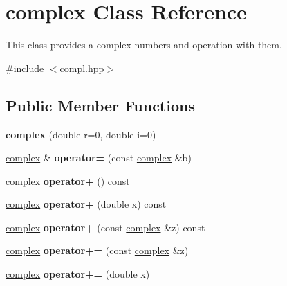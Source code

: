 \hypertarget{classcomplex}{}\section{complex Class Reference}
\label{classcomplex}


This class provides a complex numbers and operation with them.  




{\ttfamily \#include $<$compl.\+hpp$>$}

\subsection*{Public Member Functions}
\begin{DoxyCompactItemize}
\item 
\mbox{\label{classcomplex_a02480dc4c97bb508d44fd2a9218110b9}} 
{\bfseries complex} (double r=0, double i=0)
\item 
\mbox{\label{classcomplex_a87c671cba1258ebf806685ee048c04e4}} 
\mbox{\hyperlink{classcomplex}{complex}} \& {\bfseries operator=} (const \mbox{\hyperlink{classcomplex}{complex}} \&b)
\item 
\mbox{\label{classcomplex_a5782c9c6c5d00e553e859605fedb3aca}} 
\mbox{\hyperlink{classcomplex}{complex}} {\bfseries operator+} () const
\item 
\mbox{\label{classcomplex_ac087cdc8ef2c4851ac7a959f33789474}} 
\mbox{\hyperlink{classcomplex}{complex}} {\bfseries operator+} (double x) const
\item 
\mbox{\label{classcomplex_a635bb2d03c023671ac1b742aaec06c03}} 
\mbox{\hyperlink{classcomplex}{complex}} {\bfseries operator+} (const \mbox{\hyperlink{classcomplex}{complex}} \&z) const
\item 
\mbox{\label{classcomplex_a69a3baf8f78d9798c2aa220d03a53077}} 
\mbox{\hyperlink{classcomplex}{complex}} {\bfseries operator+=} (const \mbox{\hyperlink{classcomplex}{complex}} \&z)
\item 
\mbox{\label{classcomplex_ad6f6fa4a782cd727756f8b8d7b61bc21}} 
\mbox{\hyperlink{classcomplex}{complex}} {\bfseries operator+=} (double x)

\end{DoxyCompactItemize}
